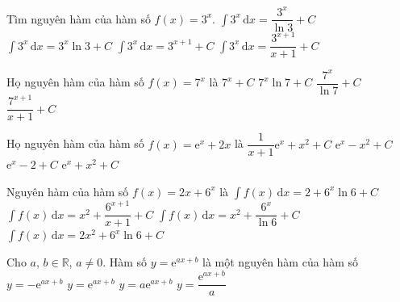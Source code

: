 \begin{ex}%
	Tìm nguyên hàm của hàm số  $f(x)=3^x$.
	 \choice
		{\True $\displaystyle\int 3^x\mathrm{\,d}x=\dfrac{3^x}{\ln 3}+C$} 
		{$\displaystyle\int  3^x\mathrm{\,d}x=3^x\ln 3+C$}
		{$\displaystyle\int 3^x\mathrm{\,d}x=3^{x+1}+C$} 
		 {$\displaystyle\int 3^x\mathrm{\,d}x=\dfrac{3^{x+1}}{x+1}+C$}
\end{ex}

\begin{ex}%
	Họ nguyên hàm của hàm  số $f(x)=7^x$ là
	 \choice
		 {$7^x+C$}
		{$7^x  \ln 7+C$}
		 {\True $\dfrac{7^x}{\ln 7}+C$}
		 {$\dfrac{7^{x+1}}{x+1}+C$}
\end{ex}

\begin{ex}%
	Họ  nguyên hàm của hàm số $f(x)=\mathrm{e}^{x}+2 x$ là
	 \choice
		{$\dfrac{1}{x+1} \mathrm{e}^{x}+x^{2}+C$} 
		 {$\mathrm{e}^{x}-x^{2}+C$}
		{$\mathrm{e}^{x}-2+C$} 
		 {\True $\mathrm{e}^{x}+x^{2}+C$}
	 \loigiai{}
\end{ex}

\begin{ex}%
	Nguyên hàm của hàm số $f(x)=2x+6^x$  là
	 \choice
		 {$\displaystyle\int f(x)\mathrm{\,d}x=2+6^x\ln 6+C$}
		{$\displaystyle\int f(x)\mathrm{\,d}x=x^2+\dfrac{6^{x+1}}{x+1}+C$} 
		{\True $\displaystyle\int f(x)\mathrm{\,d}x=x^2+\dfrac{6^x}{\ln  6}+C$}
		{$\displaystyle\int  f(x)\mathrm{\,d}x=2x^2+6^x\ln 6+C$}
\end{ex}

\begin{ex}%
	Cho $a$, $b \in \mathbb{R}$, $a \ne 0$. Hàm số $y = \mathrm{e}^{ax+b}$ là một  nguyên hàm của hàm số
	\choice 
		{$y  = -\mathrm{e}^{ax+b}$}
		{$y =  \mathrm{e}^{ax+b}$}
		{\True  $y = a \mathrm{e}^{ax+b}$}
		{$y  = \dfrac{\mathrm{e}^{ax+b}}{a}$}
\end{ex}

